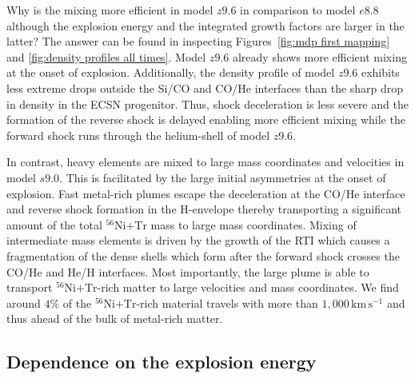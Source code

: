 \documentclass[fleqn,usenatbib]{mnras}
\newcommand{\nickel}{\ensuremath{\mathrm{^{56}Ni}}\xspace}
\newcommand{\tracer}{\ensuremath{\mathrm{Tr}}\xspace}
\newcommand{\kms}{\ensuremath{\mathrm{km\, s^{-1}}}}
\begin{document}
Why is the mixing more efficient in model $z9.6$ in comparison to model $e8.8$ although the explosion energy and the integrated growth factors are larger in the latter? 
The answer can be found in inspecting Figures~\ref{fig:mdp first mapping} and 
\ref{fig:density profiles all times}. 
Model $z9.6$ already shows more efficient mixing at the onset of explosion. 
Additionally, the density profile of model $z9.6$ exhibits less extreme drops outside the Si/CO and CO/He interfaces than the sharp drop in density in the ECSN progenitor. 
Thus, shock deceleration is less severe and the formation of the reverse shock is 
delayed enabling more efficient mixing while the forward shock runs through the 
helium-shell of model $z9.6$.

In contrast, heavy elements are mixed to large mass coordinates and velocities in model $s9.0$.
This is facilitated by the large initial asymmetries at the onset of explosion.
Fast metal-rich plumes escape the deceleration at the CO/He interface and reverse shock formation in the H-envelope thereby transporting a significant amount of the total $\nickel\mathord{+}\tracer$ mass to large mass coordinates.
Mixing of intermediate mass elements is driven by the growth of the RTI which causes a fragmentation of the dense shells which form after the forward shock crosses the CO/He and He/H interfaces.
Most importantly, the large plume is able to transport $\nickel\mathord{+}\tracer$-rich matter to large velocities and mass coordinates. We find around $4\%$ of the
$\nickel\mathord{+}\tracer$-rich material travels with more than $1,000\,\kms$ and thus ahead of the bulk of metal-rich matter.

\subsection{Dependence on the explosion energy}
\label{sec:Dependence on the explosion energy}
\end{document}

